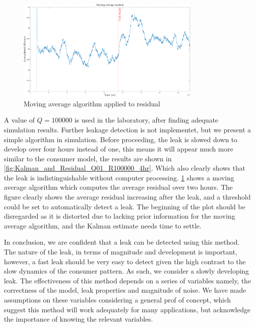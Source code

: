 \begin{figure}[h!]
	\centering
	\includegraphics[width=0.8\textwidth]{Pictures/MA_residual_Q01_R100000_AVRG4hr.pdf}
	
	\caption{Moving average algorithm applied to residual}
	\label{fig:Movingaverage}
\end{figure}

A value of $Q = 100000$ is used in the laboratory, after finding adequate simulation results. Further leakage detection is not implementet, but we present a simple algorithm in simulation. Before proceeding, the leak is slowed down to develop over four hours instead of one, this means it will appear much more similar to the consumer model, the results are shown in \cref{fig:Kalman_and_Residual_Q01_R100000_4hr}. Which also clearly shows that the leak is indistinguishable without computer processing. \cref{fig:Movingaverage} shows a moving average algorithm which computes the average residual over two hours. The figure clearly shows the average residual increasing after the leak, and a threshold could be set to automatically detect a leak. The beginning of the plot should be disregarded as it is distorted due to lacking prior information for the moving average algorithm, and the Kalman estimate needs time to settle.

In conclusion, we are confident that a leak can be detected using this method. The nature of the leak, in terms of magnitude and development is important, however, a fast leak should be very easy to detect given the high contrast to the slow dynamics of the consumer pattern. As such, we consider a slowly developing leak. The effectiveness of this method depends on a series of variables namely, the correctness of the model, leak properties and magnitude of noise. We have made assumptions on these variables considering a general prof of concept, which suggest this method will work adequately for many applications, but acknowledge the importance of knowing the relevant variables.